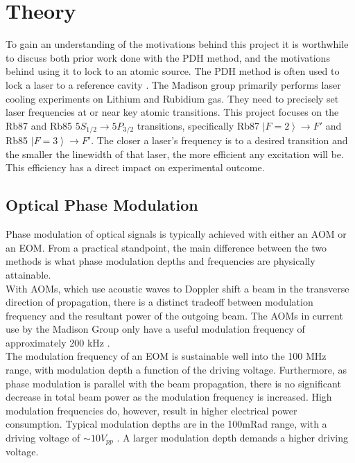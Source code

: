 \newpage
\section{Theory}
\label{sec:theory}

To gain an understanding of the motivations behind this project it is worthwhile to discuss both prior work done with the PDH method, and the motivations behind using it to lock to an atomic source.  The PDH method is often used to lock a laser to a reference cavity \cite{black1998}.  The Madison group primarily performs laser cooling experiments on Lithium and Rubidium gas.  They need to precisely set laser frequencies at or near key atomic transitions. This project focuses on the Rb87 and Rb85 $5S_{1/2} \rightarrow 5P_{3/2}$ transitions, specifically Rb87 $\left|F=2\right\rangle \rightarrow F'$ and Rb85 $\left|F=3\right\rangle \rightarrow F'$.  The closer a laser's frequency is to a desired transition and the smaller the linewidth of that laser, the more efficient any excitation will be.  This efficiency has a direct impact on experimental outcome.


\subsection{Optical Phase Modulation}

Phase modulation of optical signals is typically achieved with either an AOM or an EOM. From a practical standpoint, the main difference between the two methods is what phase modulation depths and frequencies are physically attainable. \\

With AOMs, which use acoustic waves to Doppler shift a beam in the transverse direction of propagation, there is a distinct tradeoff between modulation frequency and the resultant power of the outgoing beam.  The AOMs in current use by the Madison Group only have a useful modulation frequency of approximately 200 kHz \cite{madison14}. \\

The modulation frequency of an EOM is sustainable well into the 100 MHz range, with modulation depth a function of the driving voltage. Furthermore, as phase modulation is parallel with the beam propagation, there is no significant decrease in total beam power as the modulation frequency is increased. High modulation frequencies do, however, result in higher electrical power consumption. Typical modulation depths are in the 100mRad range, with a driving voltage of $\sim 10 V_{pp}$ \cite{thorlabs_eom}. A larger modulation depth demands a higher driving voltage. \\

